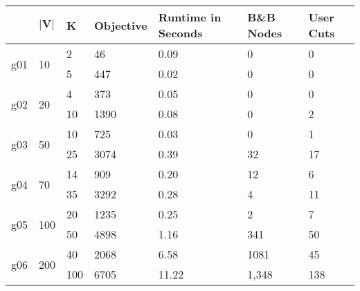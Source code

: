 \documentclass{article}
\begin{document}
\begin{table}[h!]
	\centering
	\label{tab:cec}
	\begin{tabular}{l|l|l|l|l|l|l}
		\textbf{}           & $\mathbf{|V|}$      	& \textbf{K} 	& \textbf{Objective} & \textbf{Runtime in Seconds} & \textbf{B\&B Nodes} & \textbf{User Cuts} \\ \hline
		\multirow{2}{*}{g01}& \multirow{2}{*}{10} 	& 2          	& 46                 & 0.09                        & 0             & 0                          \\
							&                   	& 5       		& 447                & 0.02                        & 0             & 0                         \\ \hline
		\multirow{2}{*}{g02}& \multirow{2}{*}{20} 	& 4          	& 373                & 0.05                        & 0             & 0                          \\
							&                   	& 10        	& 1390               & 0.08                        & 0             & 2                          \\ \hline
		\multirow{2}{*}{g03}& \multirow{2}{*}{50} 	& 10         	& 725                & 0.03                        & 0             & 1                          \\
							&                   	& 25         	& 3074               & 0.39                        & 32             & 17                         \\ \hline
		\multirow{2}{*}{g04}& \multirow{2}{*}{70} 	& 14         	& 909                & 0.20                        & 12            & 6                          \\
							&                   	& 35         	& 3292               & 0.28                        & 4             & 11                          \\ \hline
		\multirow{2}{*}{g05}& \multirow{2}{*}{100} 	& 20         	& 1235               & 0.25                        & 2             & 7                          \\
							&                   	& 50         	& 4898               & 1.16                        & 341             & 50                         \\ \hline
		\multirow{2}{*}{g06}& \multirow{2}{*}{200} 	& 40         	& 2068               & 6.58                        & 1081          & 45                           \\
							&                   	& 100        	& 6705               & 11.22                       & 1,348        & 138                           \\ \hline

\end{tabular}
\end{table}
\end{document}
